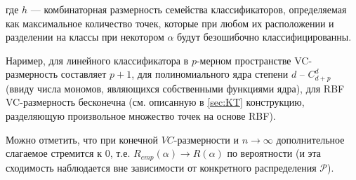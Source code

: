 \documentclass[11pt, a4paper]{article}\usepackage[]{graphicx}\usepackage[]{color}
\begin{document}
где $h$ --- комбинаторная размерность семейства  классификаторов, определяемая как максимальное количество точек,
которые при любом их расположении и разделении на классы при некотором $\alpha$ будут безошибочно классифицированны.

Наример, для линейного классификатора в $p$-мерном пространстве VC-размерность составляет $p+1$,
для полиномиального ядра степени $d$ -- $C_{d+p}^{d}$ (ввиду числа мономов, являющихся собственными функциями ядра), для RBF VC-размерность бесконечна (см. описанную в \ref{sec:KT} конструкцию, разделяющую
произвольное множество точек на основе RBF).

Можно отметить, что при конечной $VC$-размерности и $n\rightarrow\infty$ дополнительное слагаемое стремится к $0$, т.е. $R_{emp}\left(\alpha\right)\rightarrow R\left(\alpha\right)$ по вероятности
(и эта сходимость наблюдается вне зависимости от конкретного распределения $\mathcal{P}$).
\end{document}
